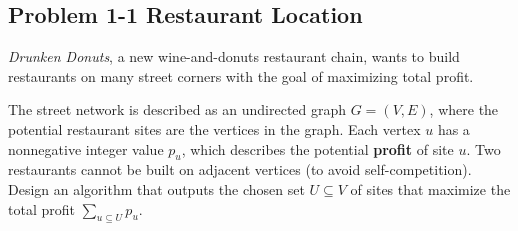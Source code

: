 \documentclass[12pt]{article}
\begin{document}
\subsection*{Problem 1-1 Restaurant Location}
\par{\textit{Drunken Donuts}, a new wine-and-donuts restaurant chain, wants to build restaurants on many street corners with the goal of maximizing total profit.}
\par{The street network is described as an undirected graph $G = (V, E)$, where the potential restaurant sites are the vertices in the graph. Each vertex $u$ has a nonnegative integer value $p_u$, which describes the potential \textbf{profit} of site $u$. Two restaurants cannot be built on adjacent vertices (to avoid self-competition). Design an algorithm that outputs the chosen set $U \subseteq V$ of sites that maximize the total profit $\sum_{u \subseteq U}p_u$.}
\end{document}
